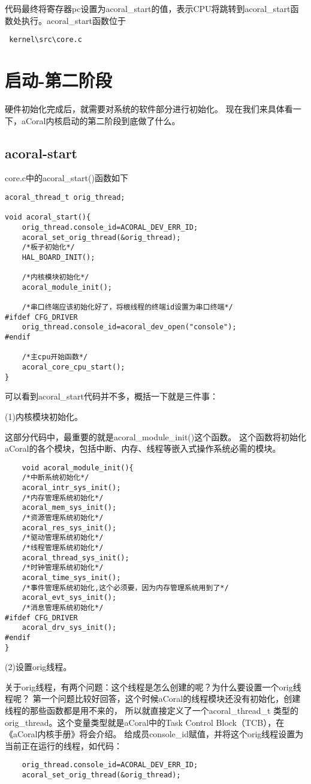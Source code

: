 代码最终将寄存器pc设置为acoral\_start的值，表示CPU将跳转到acoral\_start函数处执行。acoral\_start函数位于
\begin{lstlisting}
 kernel\src\core.c
\end{lstlisting}

\section{启动-第二阶段}

硬件初始化完成后，就需要对系统的软件部分进行初始化。
现在我们来具体看一下，aCoral内核启动的第二阶段到底做了什么。

\subsection{acoral-start}
core.c中的acoral\_start()函数如下
\begin{lstlisting}
acoral_thread_t orig_thread;

void acoral_start(){
	orig_thread.console_id=ACORAL_DEV_ERR_ID;
	acoral_set_orig_thread(&orig_thread);
	/*板子初始化*/
	HAL_BOARD_INIT();

	/*内核模块初始化*/
	acoral_module_init();

	/*串口终端应该初始化好了，将根线程的终端id设置为串口终端*/
#ifdef CFG_DRIVER
	orig_thread.console_id=acoral_dev_open("console");
#endif

	/*主cpu开始函数*/
	acoral_core_cpu_start();
}
\end{lstlisting}

可以看到acoral\_start代码并不多，概括一下就是三件事：

(1)内核模块初始化。

这部分代码中，最重要的就是acoral\_module\_init()这个函数。
这个函数将初始化aCoral的各个模块，包括中断、内存、线程等嵌入式操作系统必需的模块。
\begin{lstlisting}
	void acoral_module_init(){
	/*中断系统初始化*/
	acoral_intr_sys_init();
	/*内存管理系统初始化*/
	acoral_mem_sys_init();
	/*资源管理系统初始化*/
	acoral_res_sys_init();
	/*驱动管理系统初始化*/
	/*线程管理系统初始化*/
	acoral_thread_sys_init();
	/*时钟管理系统初始化*/
	acoral_time_sys_init();
	/*事件管理系统初始化,这个必须要，因为内存管理系统用到了*/
	acoral_evt_sys_init();
	/*消息管理系统初始化*/
#ifdef CFG_DRIVER
	acoral_drv_sys_init();
#endif
}
\end{lstlisting}

(2)设置orig线程。

关于orig线程，有两个问题：这个线程是怎么创建的呢？为什么要设置一个orig线程呢？
第一个问题比较好回答，这个时候aCoral的线程模块还没有初始化，创建线程的那些函数都是用不来的，
所以就直接定义了一个acoral\_thread\_t 类型的orig\_thread。这个变量类型就是aCoral中的Task Control Block（TCB），在《aCoral内核手册》将会介绍。 
给成员console\_id赋值，并将这个orig线程设置为当前正在运行的线程，如代码：
\begin{lstlisting}
	orig_thread.console_id=ACORAL_DEV_ERR_ID;
	acoral_set_orig_thread(&orig_thread);
\end{lstlisting}

